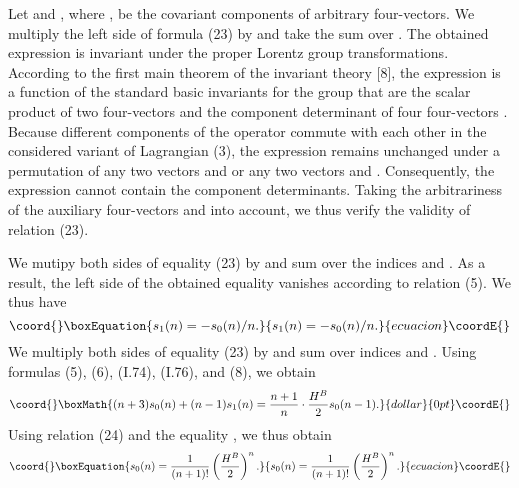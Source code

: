 \documentclass[a4paper,12pt]{article}
\begin{document}
Let \coordHE{} and \coordHE{}, where \coordHE{}, be
the covariant components of arbitrary four-vectors. We multiply the left side 
of formula (23) by \coordHE{} and take the sum over \coordHE{}. The obtained expression \coordHE{} is invariant under the proper
Lorentz group transformations. According to the first main theorem of the
invariant theory [8], the expression \coordHE{} is a function of the standard
basic invariants for the group \coordHE{} that are the scalar product 
of two four-vectors \coordHE{} and
the component determinant of four four-vectors \coordHE{}. Because different components of the operator \coordHE{}
commute with each other in the considered variant of Lagrangian (3), the
expression \coordHE{} remains unchanged under a permutation of any two vectors 
\coordHE{} and \coordHE{} or any two vectors \coordHE{} 
and \coordHE{}. Consequently, the expression \coordHE{} cannot contain
the component determinants. Taking the arbitrariness of the auxiliary
four-vectors \coordHE{} and \coordHE{} into account, we thus
verify the validity of relation (23).

We mutipy both sides of equality (23) by \coordHE{} and sum over the
indices \coordHE{} and \coordHE{}. As a result, the left side of the obtained
equality vanishes according to relation (5). We thus have
\begin{equation}\coord{}\boxEquation{
s_{1}(n) = - s_{0}(n)/n.
}{
s_{1}(n) = - s_{0}(n)/n.
}{ecuacion}\coordE{}\end{equation}
We multiply both sides of equality (23) by \coordHE{} and sum over
indices \coordHE{} and \coordHE{}. Using formulas (5), (6), (I.74), (I.76), and
(8), we obtain
$$\coord{}\boxMath{(n+3)s_{0}(n) + (n-1)s_{1}(n)=\frac{n+1}{n} \cdot \frac{H^{B}}{2} 
s_{0}(n-1).}{dollar}{0pt}\coordE{}$$
Using relation (24) and the equality \coordHE{}, we thus obtain
\begin{equation}\coord{}\boxEquation{
s_{0}(n)= \frac{1}{(n+1)!} \left( \frac{H^{B}}{2} \right)^{n}.
}{
s_{0}(n)= \frac{1}{(n+1)!} \left( \frac{H^{B}}{2} \right)^{n}.
}{ecuacion}\coordE{}\end{equation}
\end{document}
